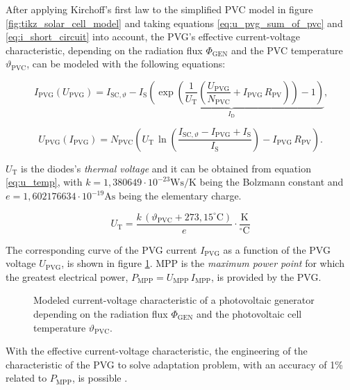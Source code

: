 After applying Kirchoff's first law to the simplified PVC model in figure \ref{fig:tikz_solar_cell_model} and taking equations \ref{eq:u_pvg_sum_of_pvc} and \ref{eq:i_short_circuit} into account, the PVG's effective current-voltage characteristic, depending on the radiation flux $\Phi_{\mathrm{GEN}}$ and the PVC temperature $\vartheta_{\mathrm{PVC}}$, can be modeled with the following equations:
\begin{center}
	\begin{equation} \label{eq:i_of_u}
		I_{\mathrm{PVG}}\left(U_{\mathrm{PVG}}\right) = I_{\mathrm{SC},\vartheta} - \underbrace{I_{\mathrm{S}} \left( \exp \left( \frac{1}{U_{\mathrm{T}}} \left( \frac{U_{\mathrm{PVG}}}{N_{\mathrm{PVC}}} + I_{\mathrm{PVG}} \, R_{\mathrm{PV}} \right) \right) - 1  \right)}_{I_{\mathrm{D}}} \text{,}
	\end{equation}
\end{center}
\begin{center}
	\begin{equation} \label{eq:u_of_i}
		U_{\mathrm{PVG}}\left(I_{\mathrm{PVG}}\right) = N_{\mathrm{PVC}} \left( U_{\mathrm{T}} \, \ln \left( \frac{I_{\mathrm{SC}, \vartheta} - I_{\mathrm{PVG}} + I_{\mathrm{S}}}{I_{\mathrm{S}}} \right) - I_{\mathrm{PVG}} \, R_{\mathrm{PV}} \right) \text{.}
	\end{equation}
\end{center}
$U_{\mathrm{T}}$ is the diodes's \emph{thermal voltage} and it can be obtained from equation \ref{eq:u_temp}, with $k = 1,380649 \cdot 10^{-23} \mathrm{Ws/K}$ being the Bolzmann constant and $e = 1,602176634\cdot10^{-19} \mathrm{As}$ being the elementary charge.
\begin{center}
	\begin{equation} \label{eq:u_temp}
		U_{\mathrm{T}} = \frac{ k \, \left( \vartheta_{\mathrm{PVC}} + 273,15^\circ \mathrm{C} \right) }{e} \cdot \frac{\mathrm{K}}{^\circ \mathrm{C}}
	\end{equation}
\end{center}
The corresponding curve of the PVG current $I_{\mathrm{PVG}}$ as a function of the PVG voltage $U_{\mathrm{PVG}}$, is shown in figure \ref{fig:tikz/tikz_PVG_curve}. MPP is the \emph{maximum power point} for which the greatest electrical power, $P_{\mathrm{MPP}} = U_{\mathrm{MPP}} \, I_{\mathrm{MPP}}$, is provided by the PVG.
\begin{figure}[h!]
	\centering
	
	\caption{Modeled current-voltage characteristic of a photovoltaic generator depending on the radiation flux $\Phi_{\mathrm{GEN}}$ and the photovoltaic cell temperature $\vartheta_{\mathrm{PVC}}$.}
	\label{fig:tikz/tikz_PVG_curve}
\end{figure}
With the effective current-voltage characteristic, the engineering of the characteristic of the PVG to solve adaptation problem, with an accuracy of 1\% related to $P_{\mathrm{MPP}}$, is possible \cite{Prechtl:2006, Mertens:2015, Tietze:2016, Wagner:2018, Elert:2020}.


